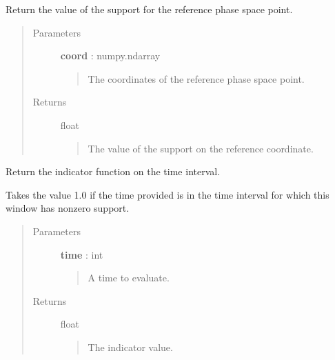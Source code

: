 \documentclass[letterpaper,10pt,english]{sphinxmanual}
\begin{document}
\begin{fulllineitems}
\begin{fulllineitems}
\end{fulllineitems}


\begin{fulllineitems}
\label{neus/neus.doc:neus.pyramid.Pyramid.ref_indicator}
Return the value of the support for the reference phase space point.
\begin{quote}\begin{description}
\item[{Parameters}] \leavevmode
\textbf{coord} : numpy.ndarray
\begin{quote}

The coordinates of the reference phase space point.
\end{quote}

\item[{Returns}] \leavevmode
float
\begin{quote}

The value of the support on the reference coordinate.
\end{quote}

\end{description}\end{quote}

\end{fulllineitems}


\begin{fulllineitems}
\label{neus/neus.doc:neus.pyramid.Pyramid.time_indicator}
Return the indicator function on the time interval.

Takes the value 1.0 if the time provided is in the time interval for which this window has nonzero support.
\begin{quote}\begin{description}
\item[{Parameters}] \leavevmode
\textbf{time} : int
\begin{quote}

A time to evaluate.
\end{quote}

\item[{Returns}] \leavevmode
float
\begin{quote}

The indicator value.
\end{quote}

\end{description}\end{quote}

\end{fulllineitems}


\end{fulllineitems}
\end{document}
